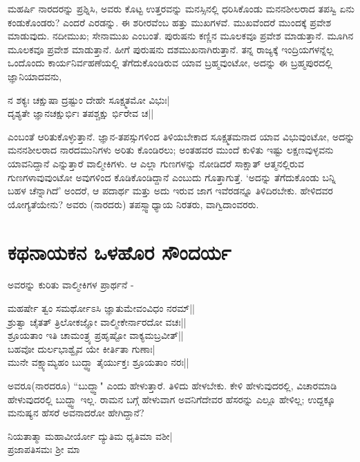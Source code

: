 ಮಹರ್ಷಿ ನಾರದರನ್ನು ಪ್ರಶ್ನಿಸಿ, ಅವರು ಕೊಟ್ಟ ಉತ್ತರವನ್ನು ಮನಸ್ಸಿನಲ್ಲಿ ಧರಿಸಿಕೊಂಡು ಮನನಶೀಲರಾದ ತಪಸ್ವಿ ಏನು ಕಂಡುಕೊಂಡರು? ಎಂದರೆ ಎರಡನ್ನು. ಈ ಶರೀರವೆಂಬ ಹತ್ತು ಮುಖಗಳವೆ. ಮುಖವೆಂದರೆ ಮುಂದಕ್ಕೆ  ಪ್ರವೇಶ ಮಾಡುವುದು. ನದೀಮುಖ; ಸೇನಾಮುಖ ಎಂಬಂತೆ. ಪುರುಷನು ಕಣ್ಣಿನ ಮೂಲಕವೂ ಪ್ರವೇಶ ಮಾಡುತ್ತಾನೆ. ಮೂಗಿನ ಮೂಲಕವೂ ಪ್ರವೇಶ ಮಾಡುತ್ತಾನೆ. ಹೀಗೆ ಪುರುಷನು ದಶಮುಖನಾಗಿರುತ್ತಾನೆ. ತನ್ನ ರಾಜ್ಯಕ್ಕೆ ಇಂದ್ರಿಯಗಳನ್ನೆಲ್ಲ ಒಂದೊಂದು ಕಾರ್ಯನಿರ್ವಹಣೆಯಲ್ಲಿ ತೆಗೆದುಕೊಂಡಿರುವ ಯಾವ ಬ್ರಹ್ಮವುಂಟೋ, ಅದನ್ನು ಈ ಬ್ರಹ್ಮಪುರದಲ್ಲಿ ಜ್ಞಾನಿಯಾದವನು,
\begin{shloka}
ನ ಶಕ್ಯಃ ಚಕ್ಷುಷಾ ದ್ರಷ್ಟುಂ ದೇಹೇ ಸೂಕ್ಷ್ಮತಮೋ ವಿಭುಃ|\\
ದೃಶ್ಯತೇ ಜ್ಞಾನಚಕ್ಷುರ್ಭಿಃ ತಪಶ್ಚಕ್ಷು ರ್ಭಿರೇವ ಚ|| 
\end{shloka}
ಎಂಬಂತೆ ಆರಿತುಕೊಳ್ಳುತ್ತಾನೆ. ಜ್ಞಾನ-ತಪಸ್ಸುಗಳಿಂದ ತಿಳಿಯಬೇಕಾದ ಸೂಕ್ಷ್ಮತಮನಾದ ಯಾವ ವಿಭುವುಂಟೋ, ಅದನ್ನು ಮನನಶೀಲರಾದ ನಾರದಮುನಿಗಳು ಅರಿತು ಕೊಂಡಿರಲು; ಅಂತಹವರ ಮುಂದೆ ಕುಳಿತು ಇಷ್ಟು ಲಕ್ಷಣವುಳ್ಳವನು ಯಾವನಿದ್ದಾನೆ ಎನ್ನುತ್ತಾರೆ ವಾಲ್ಮೀಕಿಗಳು. ಆ‌ ಎಲ್ಲಾ ಗುಣಗಳನ್ನು ನೋಡಿದರೆ ಸಾಕ್ಷಾತ್ ಆತ್ಮನಲ್ಲಿರುವ ಗುಣಗಳಾವುವುಂಟೋ ಅವುಗಳಿಂದ ಕೊಡಿಕೊಂಡಿದ್ದಾನೆ ಎಂಬುದು ಗೊತ್ತಾಗುತ್ತೆ. `ಅದನ್ನು ತೆಗೆದುಕೊಂಡು ಬನ್ನಿ ಬಹಳ ಚೆನ್ನಾಗಿದೆ' ಅಂದರೆ, ಆ ಪದಾರ್ಥ ಮತ್ತು ಅದು ಇರುವ ಜಾಗ ಇವೆರಡನ್ನೂ ತಿಳಿದಿರಬೇಕು. ಹೇಳಿದವರ ಯೋಗ್ಯತೆಯೇನು? ಅವರು (ನಾರದರು) ತಪಸ್ಸ್ವಾಧ್ಯಾಯ ನಿರತರು, ವಾಗ್ವಿದಾಂವರರು.

\section*{ಕಥನಾಯಕನ ಒಳಹೊರ ಸೌಂದರ್ಯ}

ಅವರನ್ನು ಕುರಿತು ವಾಲ್ಮೀಕಿಗಳ ಪ್ರಾರ್ಥನೆ -

\begin{shloka}
ಮಹರ್ಷೇ ತ್ವಂ ಸಮರ್ಥೋಽಸಿ ಜ್ಞಾತುಮೇವಂವಿಧಂ ನರಮ್||\\
ಶ್ರುತ್ವಾ ಚೈತತ್ ತ್ರಿಲೋಕಜ್ಞೋ ವಾಲ್ಮೀಕೇರ್ನಾರದೋ ವಚಃ||\\
ಶ್ರೂಯತಾಂ ಇತಿ ಚಾಮಂತ್ರ್ಯ ಪ್ರಹೃಷ್ಟೋ ವಾಕ್ಯಮಬ್ರವೀತ್||\\
ಬಹವೋ ದುರ್ಲಭಾಶ್ವೈವ ಯೇ ಕೀರ್ತಿತಾ ಗುಣಾಃ|\\
ಮುನೇ ವಕ್ಷ್ಯಾಮ್ಯಹಂ ಬುದ್ಧ್ವಾ ತೈರ್ಯುಕ್ತಃ ಶ್ರೂಯತಾಂ ನರಃ||\\
\end{shloka}

ಅವರೂ(ನಾರದರೂ) ``ಬುದ್ಧ್ವಾ" ಎಂದು ಹೇಳುತ್ತಾರೆ. ತಿಳಿದು ಹೇಳಬೇಕು. ಕೇಳಿ ಹೇಳುವುದರಲ್ಲಿ, ವಿಚಾರಮಾಡಿ ಹೇಳುವುದರಲ್ಲಿ ಬುದ್ಧ್ವಾ ಇಲ್ಲ. ರಾಮನ ಬಗ್ಗೆ ಹೇಳುವಾಗ ಅವನಿಗೆದೇವರ ಹೆಸರನ್ನು ಎಲ್ಲೂ ಹೇಳಿಲ್ಲ; ಉದ್ದಕ್ಕೂ ಮನುಷ್ಯನ ಹೆಸರೆ ಅವನಾದರೋ ಹೇಗಿದ್ದಾನೆ? 

\begin{shloka}
ನಿಯತಾತ್ಮಾ ಮಹಾವೀರ್ಯೋ ದ್ಯುತಿಮ ಧೃತಿಮಾ ವಶೀ|\\
ಪ್ರಜಾಪತಿಸಮಃ ಶ್ರೀ ಮಾ
\end{shloka}

